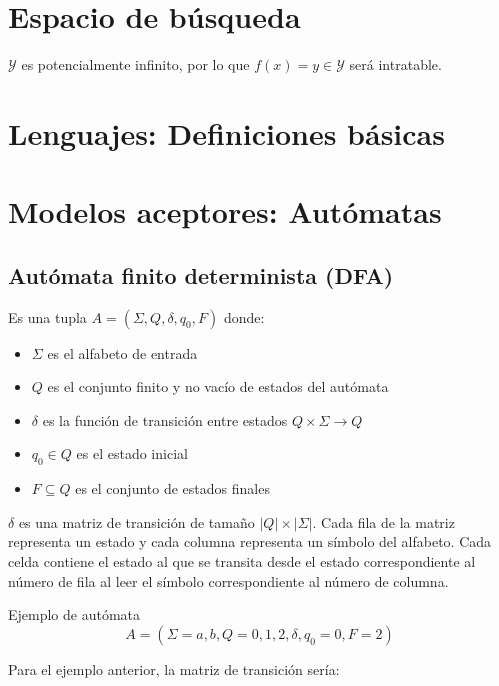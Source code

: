 \section{Espacio de búsqueda}

$\mathcal{Y}$ es potencialmente infinito, por lo que $f(x) = y \in \mathcal{Y}$
será intratable.

\section{Lenguajes: Definiciones básicas}

\section{Modelos aceptores: Autómatas}

\subsection{Autómata finito determinista (DFA)}

Es una tupla $A = (\Sigma, Q, \delta, q_0, F)$ donde:

\begin{itemize}
    \item $\Sigma$ es el alfabeto de entrada
    \item $Q$ es el conjunto finito y no vacío de estados del autómata
    \item $\delta$ es la función de transición entre estados $Q \times \Sigma \to Q$
    \item $q_0 \in Q$ es el estado inicial
    \item $F \subseteq Q$ es el conjunto de estados finales
\end{itemize}

$\delta$ es una matriz de transición de tamaño $|Q| \times |\Sigma|$.
Cada fila de la matriz representa un estado y cada columna representa un símbolo
del alfabeto. Cada celda contiene el estado al que se transita desde el estado
correspondiente al número de fila al leer el símbolo correspondiente al número
de columna.

\begin{examplebox}{Ejemplo de autómata}
    \begin{equation*}
        A = (\Sigma = {a, b}, Q = {0, 1, 2}, \delta, q_0 = 0, F = {2})
    \end{equation*}
\end{examplebox}

Para el ejemplo anterior, la matriz de transición sería:

